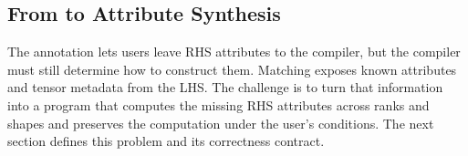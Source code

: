 \FloatBarrier
\subsection{From \texorpdfstring{}{auto} to Attribute Synthesis}
The  annotation lets users leave RHS attributes to the compiler,
but the compiler must still determine how to construct them. Matching exposes
known attributes and tensor metadata from the LHS. The challenge is to turn
that information into a program that computes the missing RHS attributes
across ranks and shapes and preserves the computation under the user's
conditions. The next section defines this problem and its correctness contract.
